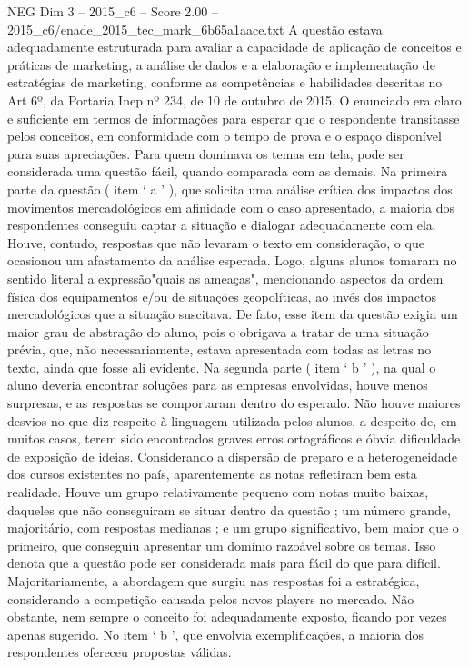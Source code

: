 \begin{textsample}{NEG Dim 3 – 2015\_c6 – Score 2.00 – 2015\_c6/enade\_2015\_tec\_mark\_6b65a1aace.txt}
A questão estava adequadamente estruturada para avaliar a capacidade de aplicação de conceitos e práticas de marketing, a análise de dados e a elaboração e implementação de estratégias de marketing, conforme as competências e habilidades descritas no Art 6º, da Portaria Inep nº 234, de 10 de outubro de 2015.
O enunciado era claro e suficiente em termos de informações para esperar que o respondente transitasse pelos conceitos, em conformidade com o tempo de prova e o espaço disponível para suas apreciações.
Para quem dominava os temas em tela, pode ser considerada uma questão fácil, quando comparada com as demais.
Na primeira parte da questão ( item ‘ a ’ ), que solicita uma análise crítica dos impactos dos movimentos mercadológicos em afinidade com o caso apresentado, a maioria dos respondentes conseguiu captar a situação e dialogar adequadamente com ela.
Houve, contudo, respostas que não levaram o texto em consideração, o que ocasionou um afastamento da análise esperada.
Logo, alguns alunos tomaram no sentido literal a expressão"quais as ameaças", mencionando aspectos da ordem física dos equipamentos e/ou de situações geopolíticas, ao invés dos impactos mercadológicos que a situação suscitava.
De fato, esse item da questão exigia um maior grau de abstração do aluno, pois o obrigava a tratar de uma situação prévia, que, não necessariamente, estava apresentada com todas as letras no texto, ainda que fosse ali evidente.
Na segunda parte ( item ‘ b ’ ), na qual o aluno deveria encontrar soluções para as empresas envolvidas, houve menos surpresas, e as respostas se comportaram dentro do esperado.
Não houve maiores desvios no que diz respeito à linguagem utilizada pelos alunos, a despeito de, em muitos casos, terem sido encontrados graves erros ortográficos e óbvia dificuldade de exposição de ideias.
Considerando a dispersão de preparo e a heterogeneidade dos cursos existentes no país, aparentemente as notas refletiram bem esta realidade.
Houve um grupo relativamente pequeno com notas muito baixas, daqueles que não conseguiram se situar dentro da questão ; um número grande, majoritário, com respostas medianas ; e um grupo significativo, bem maior que o primeiro, que conseguiu apresentar um domínio razoável sobre os temas.
Isso denota que a questão pode ser considerada mais para fácil do que para difícil.
Majoritariamente, a abordagem que surgiu nas respostas foi a estratégica, considerando a competição causada pelos novos players no mercado.
Não obstante, nem sempre o conceito foi adequadamente exposto, ficando por vezes apenas sugerido.
No item ‘ b ’, que envolvia exemplificações, a maioria dos respondentes ofereceu propostas válidas.

\end{textsample}
